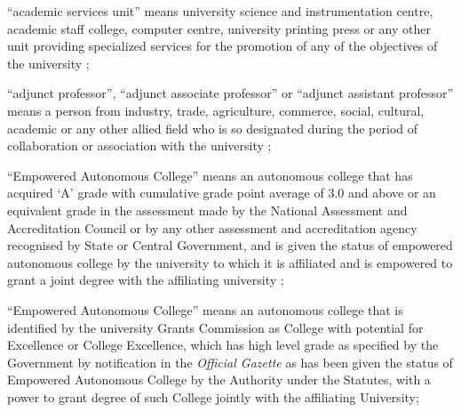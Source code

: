 \documentclass[default]{mhact}
\begin{document}
      \begin{subsectionlist}
    

``academic services unit'' means university science and instrumentation centre, academic staff college, computer centre, university printing press or any other unit providing specialized services for the promotion of any of the objectives of the university ;


``adjunct professor'', ``adjunct associate professor'' or ``adjunct assistant professor'' means a person from industry, trade, agriculture, commerce, social, cultural, academic or any other allied field who is so designated during the period of collaboration or association with the university ;


``Empowered Autonomous College'' means an autonomous college that has acquired `A' grade with cumulative grade point average of 3.0 and above or an equivalent grade in the assessment made by the National Assessment and Accreditation Council or by any other assessment and accreditation agency recognised by State or Central Government, and is given the status of empowered autonomous college by the university to which it is affiliated and is empowered to grant a joint degree with the affiliating university ;


``Empowered Autonomous College'' means an autonomous college that is identified by the university Grants Commission as College with potential for Excellence or College Excellence, which has high level grade as specified by the Government by notification in the \emph{Official Gazette} as has been given the status of Empowered Autonomous College by the Authority under the Statutes, with a power to grant degree of such College jointly with the affiliating University;





       \end{subsectionlist}
\end{document}
